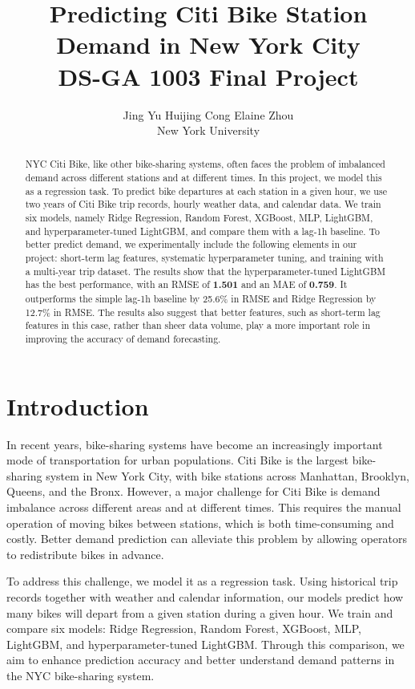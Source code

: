 \documentclass{article}
\title{\textbf{Predicting Citi Bike Station Demand in New York City}\\
\large DS-GA 1003 Final Project}
\author{
  Jing Yu \quad Huijing Cong \quad Elaine Zhou \\
  New York University
}
\date{}
\begin{document}
\maketitle

\begin{abstract}
NYC Citi Bike, like other bike-sharing systems, often faces the problem of imbalanced demand across different stations and at different times.  In this project, we model this as a regression task. To predict bike departures at each station in a given hour, we use two years of Citi Bike trip records, hourly weather data, and calendar data. We train six models, namely Ridge Regression, Random Forest, XGBoost, MLP, LightGBM, and hyperparameter-tuned LightGBM, and compare them with a lag-1h baseline. To better predict demand, we experimentally include the following elements in our project: short-term lag features, systematic hyperparameter tuning, and training with a multi-year trip dataset. The results show that the hyperparameter-tuned LightGBM has the best performance, with an RMSE of \textbf{1.501} and an MAE of \textbf{0.759}. It outperforms the simple lag-1h baseline by 25.6\% in RMSE and Ridge Regression by 12.7\% in RMSE. The results also suggest that better features, such as short-term lag features in this case, rather than sheer data volume, play a more important role in improving the accuracy of demand forecasting.
\end{abstract}

\section{Introduction}

In recent years, bike-sharing systems have become an increasingly important mode of transportation for urban populations. Citi Bike is the largest bike-sharing system in New York City, with bike stations across Manhattan, Brooklyn, Queens, and the Bronx. However, a major challenge for Citi Bike is demand imbalance across different areas and at different times. This requires the manual operation of moving bikes between stations, which is both time-consuming and costly. Better demand prediction can alleviate this problem by allowing operators to redistribute bikes in advance. 

To address this challenge, we model it as a regression task. Using historical trip records together with weather and calendar information, our models predict how many bikes will depart from a given station during a given hour. We train and compare six models: Ridge Regression, Random Forest, XGBoost, MLP, LightGBM, and hyperparameter-tuned LightGBM. Through this comparison, we aim to enhance prediction accuracy and better understand demand patterns in the NYC bike-sharing system.
\end{document}
